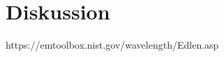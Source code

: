 
\section{Diskussion}
\label{sec:Diskussion}
https://emtoolbox.nist.gov/wavelength/Edlen.asp
\cite{bibid}